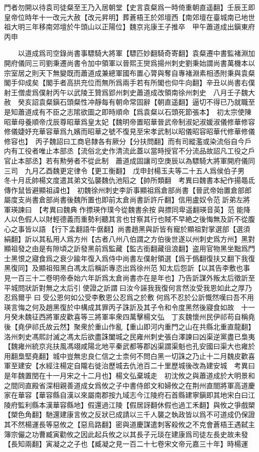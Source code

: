 門者勿開以待袁司徒粲至王乃入居朝堂【史言袁粲爲一時倚重朝直遥翻】壬辰王即皇帝位時年十一改元大赦【改元昇明】葬蒼梧王於郊壇西【南郊壇在臺城南已地世祖大明三年移南郊壇於牛頭山以正陽位】魏京兆康王子推卒　甲午蕭道成出鎭東府丙申

　　以道成爲司空錄尚書事驃騎大將軍【驃匹妙翻騎奇寄翻】袁粲遷中書監褚淵加開府儀同三司劉秉遷尚書令加中領軍以晉熙王爕爲揚州刺史劉秉始謂尚書萬機本以宗室居之則天下無變既而蕭道成兼總軍國布置心膂與奪自專褚淵素相憑附秉與袁粲閣手仰成矣【閣手者高拱充位而無所爲兩手若有所閣也仰牛向翻】辛丑以尚書右僕射王僧䖍爲僕射丙午以武陵王贊爲郢州刺史蕭道成改領南徐州刺史　八月壬子魏大赦　癸亥詔袁粲鎭石頭粲性冲靜每有朝命常固辭【朝直遥翻】逼切不得已乃就職至是知蕭道成有不臣之志隂欲圖之即時順命【爲袁粲以石頭死節張本】　初太宗使陳昭華母養順帝戊辰尊昭華爲皇太妃【魏明帝置昭華晉武帝制淑妃淑媛淑儀修華修容修儀婕妤充華容華爲九嬪而昭華之號不復見至宋孝武制以昭儀昭容昭華代修華修儀修容也】　丙子魏詔曰工商皂隸各有厥分【分扶問翻】而有司縱濫或染流俗自今戶内有工役者唯止本部丞【流俗北史作清流此蓋以當時授官不分流品故詔凡工役之戶官止本部丞】若有勲勞者不從此制　蕭道成固讓司空庚辰以為驃騎大將軍開府儀同三司　九月乙酉魏更定律令【更工衡翻】　戊申封楊玉夫等二十五人爲侯伯子男　冬十月氐帥楊文度遣其弟文弘襲魏仇池䧟之【帥所類翻　考異曰魏書本紀作揚黽氐傳作鼠皆避顯祖諱也】　初魏徐州刺史李訢事顯祖爲倉部尚書【晉武帝始置倉部郎屬度支尚書倉部尚書後魏所置也即前太倉尚書訢許斤翻】信用盧奴令范訢弟左將軍瑛諫曰　【考異曰魏典作摽瑛作璞今從魏書余按與摽同卑遥翻瑛音英】范能降人以色假人以財輕德義而重勢利聽其言也甘察其行也賊不早絶之後悔無及訢不從腹心之事皆以語【行下孟翻語牛倨翻】尚書趙黑與訢皆有寵於顯祖對掌選部【選須絹翻】訢以其私用人爲方州【古者八州八伯謂之方伯後世遂以州刺史爲方州】黑對顯祖發之由是有隙頃之訢發黑前爲監藏【監古銜翻藏徂浪翻】盗用官物黑坐黜爲門士黑恨之寢食爲之衰少踰年復入爲侍中尚書左僕射領選【爲于僞翻復扶又翻下我復黑復同】及顯祖殂黑白馮太后稱訢專恣出爲徐州范知太后怨訢【以其告李敷也事見一百三十二卷明帝泰始六年訢爲太倉尚書亦在是年也】乃告訢謀外叛太后徵訢至平城問狀訢對無之太后引使證之訢謂曰汝今誣我我復何言然汝受我恩如此之厚乃忍爲爾乎曰受公恩何如公受李敷恩公忍爲之於敷何爲不忍於公訢慨然嘆曰吾不用瑛言悔之何及趙黑復於中構成其罪丙子誅訢及其子令和令度黑然後寢食如故　十一月癸未魏征西將軍皮歡喜等三將軍率衆四萬擊楊文弘　丁亥魏懷州民伊祁苟自稱堯後【堯伊祁氏故云然】聚衆於重山作亂【重山即河内重門之山在共縣北重直龍翻】洛州刺史馮熙討滅之馮太后欲盡誅闔城之民雍州刺史張白澤諫曰凶渠逆黨盡已梟夷【魏雍州統京兆扶風馮翊咸陽北地平秦武都等郡凶渠謂渠魁也孔安國曰渠大也雍於用翻梟堅堯翻】城中豈無忠良仁信之士柰何不問白黑一切誅之乃止十二月魏皮歡喜軍至建安【水經注楊定自隴右徙治歷城去仇池百二十里歷城後改為建安城　考異曰是年魏置閏在十一月宋之十二月也】楊文弘棄城走　初沈攸之與蕭道成於大明景和之間同直殿省深相親善道成女爲攸之子中書侍郎文和婦攸之在荆州直閤將軍高道慶家在華容【華容縣自漢以來屬南郡按九域志今江陵府石首縣建寧鎭即其地宋白曰江陵府監利縣本漢華容縣地】假還過江陵【假居訝翻休假也過工禾翻】與攸之爭戲槊【槊色角翻】馳還建康言攸之反狀已成請以三千人襲之執政皆以爲不可道成仍保證其不然楊運長等惡攸之【惡烏路翻】密與道慶謀遣刺客殺攸之不克會蒼梧王遇弑主簿宗儼之功曹臧寅勸攸之因此起兵攸之以其長子元琰在建康爲司徒左長史故未發【長知兩翻】寅凝之之子也【臧凝之見一百二十七卷宋文帝元嘉三十年】時楊運